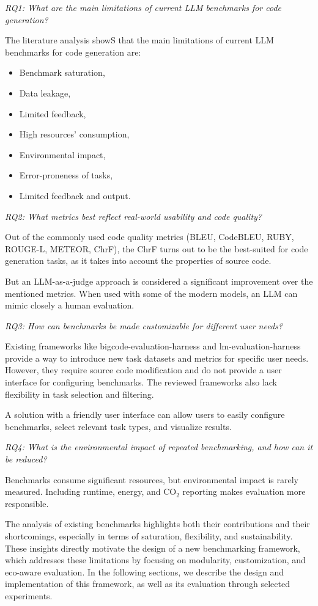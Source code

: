 \textit{RQ1: What are the main limitations of current LLM benchmarks for code generation?}

The literature analysis showS that the main limitations of current LLM benchmarks for code generation are:

\begin{itemize}
    \item Benchmark saturation,
    \item Data leakage,
    \item Limited feedback,
    \item High resources' consumption,
    \item Environmental impact,
    \item Error-proneness of tasks,
    \item Limited feedback and output.
\end{itemize}

\textit{RQ2: What metrics best reflect real-world usability and code quality?}

Out of the commonly used code quality metrics (BLEU, CodeBLEU, RUBY, ROUGE-L, METEOR, ChrF), the ChrF turns out to be the best-suited for code generation tasks, as it takes into account the properties of source code.

But an LLM-as-a-judge approach is considered a significant improvement over the mentioned metrics.
When used with some of the modern models, an LLM can mimic closely a human evaluation.

\textit{RQ3: How can benchmarks be made customizable for different user needs?}

Existing frameworks like bigcode-evaluation-harness and lm-evaluation-harness provide a way to introduce new task datasets and metrics for specific user needs.
However, they require source code modification and do not provide a user interface for configuring benchmarks.
The reviewed frameworks also lack flexibility in task selection and filtering.

A solution with a friendly user interface can allow users to easily configure benchmarks, select relevant task types, and visualize results.

\textit{RQ4: What is the environmental impact of repeated benchmarking, and how can it be reduced?}

Benchmarks consume significant resources, but environmental impact is rarely measured. Including runtime, energy, and CO$_2$ reporting makes evaluation more responsible.


The analysis of existing benchmarks highlights both their contributions and their shortcomings, especially in terms of saturation, flexibility, and sustainability.
These insights directly motivate the design of a new benchmarking framework, which addresses these limitations by focusing on modularity, customization, and eco-aware evaluation.
In the following sections, we describe the design and implementation of this framework, as well as its evaluation through selected experiments.


